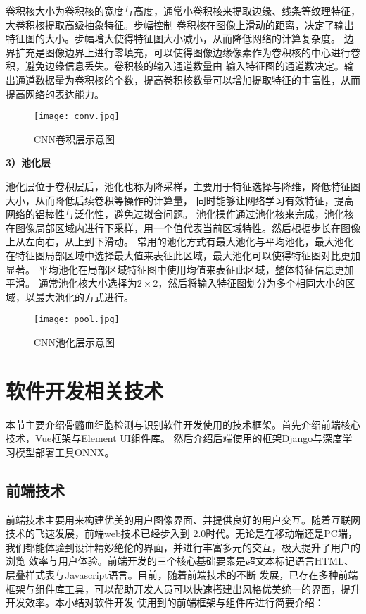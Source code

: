 卷积核大小为卷积核的宽度与高度，通常小卷积核来提取边缘、线条等纹理特征，大卷积核提取高级抽象特征。步幅控制
卷积核在图像上滑动的距离，决定了输出特征图的大小。步幅增大使得特征图大小减小，从而降低网络的计算复杂度。
边界扩充是图像边界上进行零填充，可以使得图像边缘像素作为卷积核的中心进行卷积，避免边缘信息丢失。卷积核的输入通道数量由
输入特征图的通道数决定。输出通道数据量为卷积核的个数，提高卷积核数量可以增加提取特征的丰富性，从而提高网络的表达能力。

\begin{figure}[htbp]
  \centering
  \texttt{[image: conv.jpg]}
  \caption{CNN卷积层示意图}
  \label{fig:conv}
\end{figure}

\textbf{3）池化层}

池化层位于卷积层后，池化也称为降采样，主要用于特征选择与降维，降低特征图大小，从而降低后续卷积等操作的计算量，
同时能够让网络学习有效特征，提高网络的铝棒性与泛化性，避免过拟合问题。
池化操作通过池化核来完成，池化核在图像局部区域内进行下采样，用一个值代表当前区域特性。然后根据步长在图像上从左向右，从上到下滑动。
常用的池化方式有最大池化与平均池化，最大池化在特征图局部区域中选择最大值来表征此区域，最大池化可以使得特征图对比更加显著。
平均池化在局部区域特征图中使用均值来表征此区域，整体特征信息更加平滑。
通常池化核大小选择为$2 \times 2$，然后将输入特征图划分为多个相同大小的区域，以最大池化的方式进行。

\begin{figure}[htbp]
  \centering
  \texttt{[image: pool.jpg]}
  \caption{CNN池化层示意图}
  \label{fig:pool}
\end{figure}


\section{软件开发相关技术}
本节主要介绍骨髓血细胞检测与识别软件开发使用的技术框架。首先介绍前端核心技术，Vue框架与Element UI组件库。
然后介绍后端使用的框架Django与深度学习模型部署工具ONNX。

\subsection{前端技术}

前端技术主要用来构建优美的用户图像界面、并提供良好的用户交互。随着互联网技术的飞速发展，前端web技术已经步入到
2.0时代。无论是在移动端还是PC端，我们都能体验到设计精妙绝伦的界面，并进行丰富多元的交互，极大提升了用户的浏览
效率与用户体验。前端开发的三个核心基础要素是超文本标记语言HTML、层叠样式表与Javascript语言。目前，随着前端技术的不断
发展，已存在多种前端框架与组件库工具，可以帮助开发人员可以快速搭建出风格优美统一的界面，提升开发效率。本小结对软件开发
使用到的前端框架与组件库进行简要介绍：

